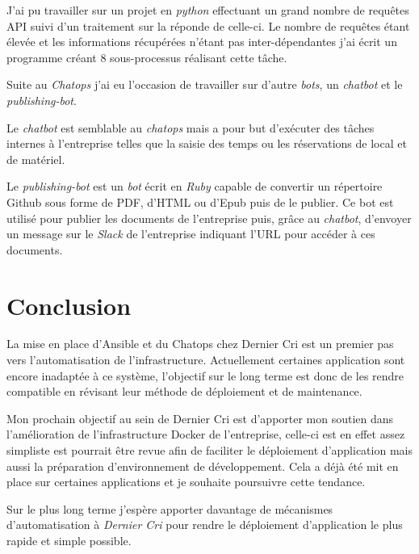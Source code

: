\documentclass[12pt,a4paper]{article}
\begin{document}
  \bigskip

  J'ai pu travailler sur un projet en \emph{python} effectuant un grand
  nombre de requêtes API suivi d'un traitement sur la réponde de celle-ci.
  Le nombre de requêtes étant élevée et les informations récupérées
  n'étant pas inter-dépendantes j'ai écrit un programme créant 8
  sous-processus réalisant cette tâche.

  \bigskip

  Suite au \emph{Chatops} j'ai eu l'occasion de travailler sur d'autre
  \emph{bots}, un \emph{chatbot} et le \emph{publishing-bot}.

  \bigskip

  Le \emph{chatbot} est semblable au \emph{chatops} mais a pour but
  d'exécuter des tâches internes à l'entreprise telles que la saisie des
  temps ou les réservations de local et de matériel.

  \bigskip

  Le \emph{publishing-bot} est un \emph{bot} écrit en \emph{Ruby} capable
  de convertir un répertoire Github sous forme de PDF, d'HTML ou d'Epub
  puis de le publier. Ce bot est utilisé pour publier les documents de
  l'entreprise puis, grâce au \emph{chatbot}, d'envoyer un message sur le
  \emph{Slack} de l'entreprise indiquant l'URL pour accéder à ces
  documents.

  \newpage

  \section{Conclusion}\label{conclusion}

  \bigskip

  La mise en place d'Ansible et du Chatops chez Dernier Cri est un premier
  pas vers l'automatisation de l'infrastructure. Actuellement certaines
  application sont encore inadaptée à ce système, l'objectif sur le long
  terme est donc de les rendre compatible en révisant leur méthode de
  déploiement et de maintenance.

  \bigskip

  Mon prochain objectif au sein de Dernier Cri est d'apporter mon soutien
  dans l'amélioration de l'infrastructure Docker de l'entreprise, celle-ci
  est en effet assez simpliste est pourrait être revue afin de faciliter
  le déploiement d'application mais aussi la préparation d'environnement
  de développement. Cela a déjà été mit en place sur certaines
  applications et je souhaite poursuivre cette tendance.

  \bigskip

  Sur le plus long terme j'espère apporter davantage de mécanismes
  d'automatisation à \emph{Dernier Cri} pour rendre le déploiement
  d'application le plus rapide et simple possible.
  
\end{document}

